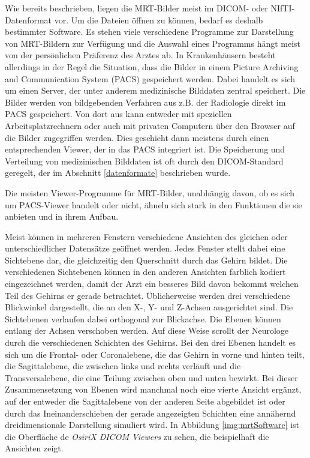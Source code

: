 Wie bereits beschrieben, liegen die MRT-Bilder meist im DICOM- oder NIfTI-Datenformat vor. Um die Dateien öffnen zu können, bedarf es deshalb bestimmter Software. Es stehen viele verschiedene Programme zur Darstellung von MRT-Bildern zur Verfügung und die Auswahl eines Programms hängt meist von der persönlichen Präferenz des Arztes ab. 
In Krankenhäusern besteht allerdings in der Regel die Situation, dass die Bilder in einem Picture Archiving and Communication System (PACS) gespeichert werden. Dabei handelt es sich um einen Server, der unter anderem medizinische Bilddaten zentral speichert. Die Bilder werden von bildgebenden Verfahren aus z.B. der Radiologie direkt im PACS gespeichert. Von dort aus kann entweder mit speziellen Arbeitsplatzrechnern oder auch mit privaten Computern über den Browser auf die Bilder zugegriffen werden. Dies geschieht dann meistens durch einen entsprechenden Viewer, der in das PACS integriert ist. Die Speicherung und Verteilung von medizinischen Bilddaten ist oft durch den DICOM-Standard geregelt, der im Abschnitt \ref{datenformate} beschrieben wurde.

Die meisten Viewer-Programme für MRT-Bilder, unabhängig davon, ob es sich um PACS-Viewer handelt oder nicht, ähneln sich stark in den Funktionen die sie anbieten und in ihrem Aufbau.

Meist können in mehreren Fenstern verschiedene Ansichten des gleichen oder unterschiedlicher Datensätze geöffnet werden. Jedes Fenster stellt dabei eine Sichtebene dar, die gleichzeitig den Querschnitt durch das Gehirn bildet. Die verschiedenen Sichtebenen können in den anderen Ansichten farblich kodiert eingezeichnet werden, damit der Arzt ein besseres Bild davon bekommt welchen Teil des Gehirns er gerade betrachtet.
Üblicherweise werden drei verschiedene Blickwinkel dargestellt, die an den X-, Y- und Z-Achsen ausgerichtet sind. Die Sichtebenen verlaufen dabei orthogonal zur Blickachse. Die Ebenen können entlang der Achsen verschoben werden. Auf diese Weise scrollt der Neurologe durch die verschiedenen Schichten des Gehirns. 
Bei den drei Ebenen handelt es sich um die Frontal- oder Coronalebene, die das Gehirn in vorne und hinten teilt, die Sagittalebene, die zwischen links und rechts verläuft und die Transversalebene, die eine Teilung zwischen oben und unten bewirkt.  
Bei dieser Zusammensetzung von Ebenen wird manchmal noch eine vierte Ansicht ergänzt, auf der entweder die Sagittalebene von der anderen Seite abgebildet ist oder durch das Ineinanderschieben der gerade angezeigten Schichten eine annähernd dreidimensionale Darstellung simuliert wird. 
In Abbildung \ref{img:mrtSoftware} ist die Oberfläche de \textit{OsiriX DICOM Viewers} zu sehen, die beispielhaft die Ansichten zeigt.

